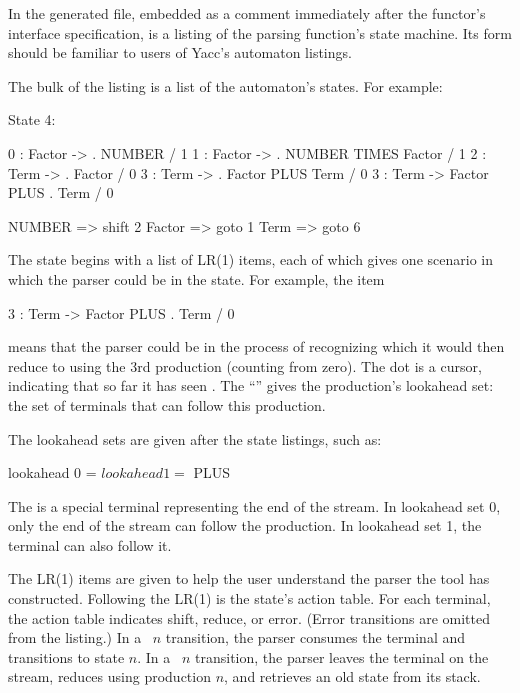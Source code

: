 \documentclass[10pt]{article}
\begin{document}
\begin{strictcode}
\begin{strictcode}
\begin{strictcode}
\begin{strictcode}
\begin{strictcode}
\begin{strictcode}
\begin{strictcode}
In the generated file, embedded as a comment immediately after the
functor's interface specification, is a listing of the parsing
function's state machine.  Its form should be familiar to users of
Yacc's automaton listings.

The bulk of the listing is a list of the automaton's states.  For
example:

\begin{code}
State 4:

0 : Factor -> . NUMBER  / 1
1 : Factor -> . NUMBER TIMES Factor  / 1
2 : Term -> . Factor  / 0
3 : Term -> . Factor PLUS Term  / 0
3 : Term -> Factor PLUS . Term  / 0

NUMBER => shift 2
Factor => goto 1
Term => goto 6
\end{code}

The state begins with a list of LR(1) items, each of which gives one
scenario in which the parser could be in the state.  For example, the
item

\begin{code}
3 : Term -> Factor PLUS . Term  / 0
\end{code}

\noindent
means that the parser could be in the process of recognizing
 which it would then reduce to  using
the 3rd production (counting from zero).  The dot is a cursor,
indicating that so far it has seen
.  The ``'' gives the production's lookahead
set: the set of terminals that can follow this production.

The lookahead sets are given after the state listings, such as:

\begin{code}
lookahead 0 = $ 
lookahead 1 = $ PLUS 
\end{code}

The \cd{$} is a special terminal representing the end of the stream.
In lookahead set 0, only the end of the stream can follow the
production.  In lookahead set 1, the  terminal can also
follow it.

The LR(1) items are given to help the user understand the parser the
tool has constructed.  Following the LR(1) is the state's action table.
For each terminal, the action table indicates shift, reduce, or error.
(Error transitions are omitted from the listing.)  In a ~$n$
transition, the parser consumes the terminal and transitions to state
$n$.  In a ~$n$ transition, the parser leaves the terminal on the
stream, reduces using production $n$, and retrieves an old state from
its stack.


\end{strictcode}
\end{strictcode}
\end{strictcode}
\end{strictcode}
\end{strictcode}
\end{strictcode}
\end{strictcode}
\end{document}
